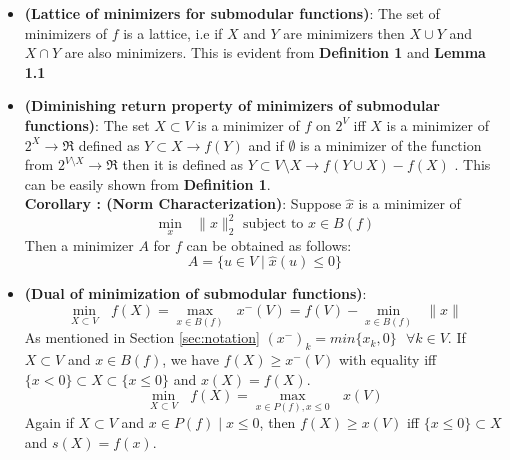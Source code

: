 \begin{itemize}
 \item {\bf \lemma (Lattice of minimizers for submodular functions)}: The set of minimizers of $f$ is a lattice, i.e if $X$ and $Y$ are minimizers then $X\cup Y$ and $X \cap Y$ are also minimizers. This is evident from {\bf Definition 1} and {\bf Lemma 1.1}\\

 \item {\bf \lemma (Diminishing return property of minimizers of submodular functions)}: The set $X \subset V$ is a minimizer of $f$ on $2^V$ iff $X$ is a minimizer of $2^X \rightarrow \Re$ defined as $Y \subset X \rightarrow f(Y)$ and if $\emptyset$ is a minimizer of the function from $2^{V\setminus X} \rightarrow \Re$  then it is defined as $Y \subset V\setminus X \rightarrow f(Y \cup X) - f(X)$ . This can be easily shown from {\bf Definition 1}.\\
 
  {\bf Corollary : (Norm Characterization)}: Suppose $\hat{x}$ is a minimizer of 
 \[
  \underset{x}{\operatorname{min }}\text{ } \| x\|_2^2 \text{ subject to } x\in B(f)
 \]
 Then a minimizer $A$ for $f$ can be obtained as follows:
 \[
   A = \{ u \in V \mid \hat{x}(u) \leq 0\}
 \]

  \item{\bf \lemma (Dual of minimization of submodular functions)}: \[ \underset{X \subset V}{\operatorname{min }}\text{ } f(X) =  \underset{x \in B(f) }{\operatorname{max }}\text{ } x^-(V) = f(V) - \underset{x \in B(f) }{\operatorname{min }}\text{ } \|x\| \]
  As mentioned in Section \ref{sec:notation} $(x^-)_k = min\{x_k,0\} \text{ } \forall k \in V$. If $X \subset V$ and $x \in B(f)$, we have $f(X) \geq x^-(V)$ with equality iff $\{ x < 0 \} \subset X \subset \{ x\leq 0\}$ and $x(X) = f(X)$. \\
  \[
   \underset{X \subset V}{\operatorname{min }}\text{ } f(X) =  \underset{x \in P(f), x\leq 0 }{\operatorname{max }}\text{ } x(V)
  \]
  Again if $X\subset V$ and $x\in P(f) \mid x \leq 0$, then $f(X) \geq x(V)$ iff $\{x \leq 0 \} \subset X$ and $s(X) = f(x)$.\\

\end{itemize}
